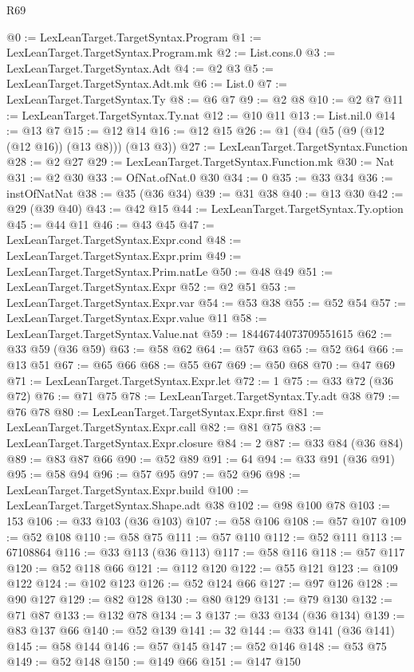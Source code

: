 \begin{lexlean}{R69}
\begin{coremodule}
@0 := LexLeanTarget.TargetSyntax.Program
@1 := LexLeanTarget.TargetSyntax.Program.mk
@2 := List.cons.{0}
@3 := LexLeanTarget.TargetSyntax.Adt
@4 := @2 @3
@5 := LexLeanTarget.TargetSyntax.Adt.mk
@6 := List.{0}
@7 := LexLeanTarget.TargetSyntax.Ty
@8 := @6 @7
@9 := @2 @8
@10 := @2 @7
@11 := LexLeanTarget.TargetSyntax.Ty.nat
@12 := @10 @11
@13 := List.nil.{0}
@14 := @13 @7
@15 := @12 @14
@16 := @12 @15
@26 := @1 (@4 (@5 (@9 (@12 (@12 @16)) (@13 @8))) (@13 @3))
@27 := LexLeanTarget.TargetSyntax.Function
@28 := @2 @27
@29 := LexLeanTarget.TargetSyntax.Function.mk
@30 := Nat
@31 := @2 @30
@33 := OfNat.ofNat.{0} @30
@34 := 0
@35 := @33 @34
@36 := instOfNatNat
@38 := @35 (@36 @34)
@39 := @31 @38
@40 := @13 @30
@42 := @29 (@39 @40)
@43 := @42 @15
@44 := LexLeanTarget.TargetSyntax.Ty.option
@45 := @44 @11
@46 := @43 @45
@47 := LexLeanTarget.TargetSyntax.Expr.cond
@48 := LexLeanTarget.TargetSyntax.Expr.prim
@49 := LexLeanTarget.TargetSyntax.Prim.natLe
@50 := @48 @49
@51 := LexLeanTarget.TargetSyntax.Expr
@52 := @2 @51
@53 := LexLeanTarget.TargetSyntax.Expr.var
@54 := @53 @38
@55 := @52 @54
@57 := LexLeanTarget.TargetSyntax.Expr.value @11
@58 := LexLeanTarget.TargetSyntax.Value.nat
@59 := 18446744073709551615
@62 := @33 @59 (@36 @59)
@63 := @58 @62
@64 := @57 @63
@65 := @52 @64
@66 := @13 @51
@67 := @65 @66
@68 := @55 @67
@69 := @50 @68
@70 := @47 @69
@71 := LexLeanTarget.TargetSyntax.Expr.let
@72 := 1
@75 := @33 @72 (@36 @72)
@76 := @71 @75
@78 := LexLeanTarget.TargetSyntax.Ty.adt @38
@79 := @76 @78
@80 := LexLeanTarget.TargetSyntax.Expr.first
@81 := LexLeanTarget.TargetSyntax.Expr.call
@82 := @81 @75
@83 := LexLeanTarget.TargetSyntax.Expr.closure
@84 := 2
@87 := @33 @84 (@36 @84)
@89 := @83 @87 @66
@90 := @52 @89
@91 := 64
@94 := @33 @91 (@36 @91)
@95 := @58 @94
@96 := @57 @95
@97 := @52 @96
@98 := LexLeanTarget.TargetSyntax.Expr.build
@100 := LexLeanTarget.TargetSyntax.Shape.adt @38
@102 := @98 @100 @78
@103 := 153
@106 := @33 @103 (@36 @103)
@107 := @58 @106
@108 := @57 @107
@109 := @52 @108
@110 := @58 @75
@111 := @57 @110
@112 := @52 @111
@113 := 67108864
@116 := @33 @113 (@36 @113)
@117 := @58 @116
@118 := @57 @117
@120 := @52 @118 @66
@121 := @112 @120
@122 := @55 @121
@123 := @109 @122
@124 := @102 @123
@126 := @52 @124 @66
@127 := @97 @126
@128 := @90 @127
@129 := @82 @128
@130 := @80 @129
@131 := @79 @130
@132 := @71 @87
@133 := @132 @78
@134 := 3
@137 := @33 @134 (@36 @134)
@139 := @83 @137 @66
@140 := @52 @139
@141 := 32
@144 := @33 @141 (@36 @141)
@145 := @58 @144
@146 := @57 @145
@147 := @52 @146
@148 := @53 @75
@149 := @52 @148
@150 := @149 @66
@151 := @147 @150

\end{coremodule}
\end{lexlean}
